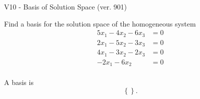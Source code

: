 \begin{exercise}
  \begin{exerciseTitle}V10 - Basis of Solution Space (ver. 901)\end{exerciseTitle}
  \begin{exerciseStatement}
    Find a basis for the solution space of the homogeneous system 
\begin{align*}
 5 x_ 1 -4 x_ 2 -6 x_ 3 &= 0  \\ 
  2 x_ 1 -5 x_ 2 -3 x_ 3 &= 0  \\ 
  4 x_ 1 -3 x_ 2 -2 x_ 3 &= 0  \\ 
  -2 x_ 1 -6 x_ 2 &= 0  \\ 
 \end{align*}


 
  \end{exerciseStatement}

  \begin{exerciseAnswer}
   A basis is   
\[\left\{\right\}.\]

  


  \end{exerciseAnswer}
\end{exercise}
